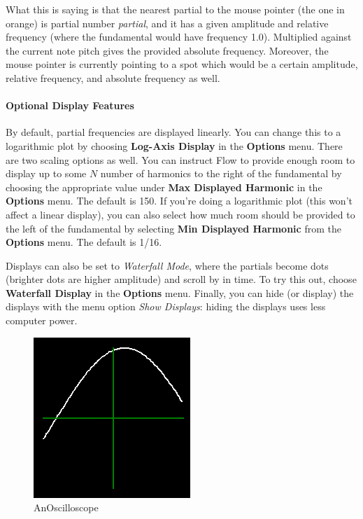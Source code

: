 \documentclass{article}
\begin{document}
What this is saying is that the nearest partial to the mouse pointer (the one in orange) is partial number {\it partial}, and it has a given amplitude and relative frequency (where the fundamental would have frequency 1.0).  Multiplied against the current note pitch gives the provided absolute frequency.  Moreover, the mouse pointer is currently pointing to a spot which would be a certain amplitude, relative frequency, and absolute frequency as well.


\paragraph{Optional Display Features}
By default, partial frequencies are displayed linearly.  You can change this to a logarithmic plot by choosing {\bf Log-Axis Display} in the {\bf Options} menu.  There are two scaling options as well.  You can instruct Flow to provide enough room to display up to some \(N\) number of harmonics to the right of the fundamental by choosing the appropriate value under {\bf Max Displayed Harmonic} in the {\bf Options} menu.  The default is 150. If you're doing a logarithmic plot (this won't affect a linear display), you can also select how much room should be provided to the left of the fundamental by selecting {\bf Min Displayed Harmonic} from the {\bf Options} menu.  The default is 1/16.

Displays can also be set to {\it Waterfall Mode}, where the partials become dots (brighter dots are higher amplitude) and scroll by in time.  To try this out, choose {\bf Waterfall Display} in the {\bf Options} menu.  Finally, you can hide (or display) the displays with the menu option {\it Show Displays}: hiding the displays uses less computer power.

\begin{figure}
\vspace{-1em}
\includegraphics[height=.85in]{oscilloscope}
\vspace{-1.5em}
\caption{An\newline Oscilloscope}
\vspace{-1em}
\label{oscilloscope}
\end{figure}
\end{document}
